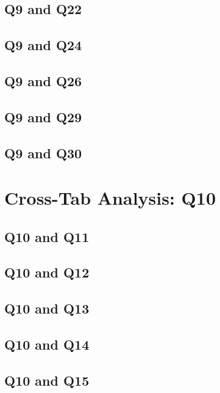 \documentclass{report}
\begin{document}
\clearpage
\section{Q9 and Q22}


\clearpage
\section{Q9 and Q24}


\clearpage
\section{Q9 and Q26}


\clearpage
\section{Q9 and Q29}


\clearpage
\section{Q9 and Q30}


\chapter{Cross-Tab Analysis: Q10}
\section{Q10 and Q11}


\clearpage
\section{Q10 and Q12}


\clearpage
\section{Q10 and Q13}


\clearpage
\section{Q10 and Q14}


\clearpage
\section{Q10 and Q15}

\end{document}
